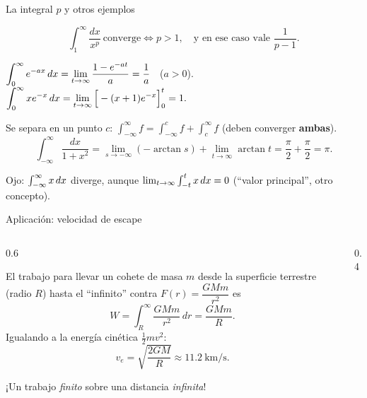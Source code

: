 \documentclass[10pt,aspectratio=169]{beamer}
\begin{document}
\begin{frame}{La integral $p$ y otros ejemplos}
  \begin{teorema}[integral $p$]
    \[ \int_1^\infty\frac{dx}{x^p}\ \text{converge}\iff p>1,\quad\text{y en ese caso vale }\frac1{p-1}. \]
  \end{teorema}
  \begin{ejemplo}[3]
    $\displaystyle\int_0^\infty e^{-ax}\,dx=\lim_{t\to\infty}\frac{1-e^{-at}}{a}=\frac1a$ \ ($a>0$). \qquad
    $\displaystyle\int_0^\infty xe^{-x}\,dx=\lim_{t\to\infty}\Big[-(x+1)e^{-x}\Big]_0^t=1.$
  \end{ejemplo}
  \begin{ejemplo}
    Se separa en un punto $c$: $\displaystyle\int_{-\infty}^\infty f=\int_{-\infty}^cf+\int_c^\infty f$ (deben converger \textbf{ambas}).
    \[ \int_{-\infty}^\infty\frac{dx}{1+x^2}=\lim_{s\to-\infty}(-\arctan s)+\lim_{t\to\infty}\arctan t=\frac\pi2+\frac\pi2=\pi. \]
  \end{ejemplo}
  \small \alert{Ojo:} $\int_{-\infty}^\infty x\,dx$ diverge, aunque $\lim_{t\to\infty}\int_{-t}^tx\,dx=0$ (``valor principal'', otro concepto).
\end{frame}

\begin{frame}{Aplicación: velocidad de escape}
  \begin{columns}
    \begin{column}{0.6\textwidth}
      \begin{ejemplo}[5]
        El trabajo para llevar un cohete de masa $m$ desde la superficie terrestre (radio $R$) hasta el ``infinito'' contra
        $F(r)=\dfrac{GMm}{r^2}$ es
        \[ W=\int_R^\infty\frac{GMm}{r^2}\,dr=\frac{GMm}{R}. \]
        Igualando a la energía cinética $\tfrac12mv^2$:
        \[ v_e=\sqrt{\frac{2GM}{R}}\approx11.2\ \text{km/s}. \]
      \end{ejemplo}
      \small ¡Un trabajo \emph{finito} sobre una distancia \emph{infinita}!
    \end{column}
    \begin{column}{0.4\textwidth}
      \centering
    \end{column}
  \end{columns}
\end{frame}
\end{document}
